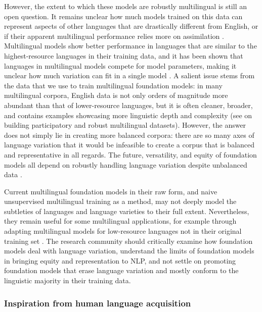 However, the extent to which these models are robustly multilingual is still an open question. 
It remains unclear how much models trained on this data can represent aspects of other languages that are drastically different from English, or if their apparent multilingual performance relies more on assimilation \citep{lauscher2020zero, virtanen2019multilingual, artetxe_cross-lingual_2020}. Multilingual models show better performance in languages that are similar to the highest-resource languages in their training data, and it has been shown that languages in multilingual models compete for model parameters, making it unclear how much variation can fit in a single model \citep{wang2020negative}. A salient issue stems from the data that we use to train multilingual foundation models: in many multilingual corpora, English data is not only orders of magnitude more abundant than that of lower-resource languages, but it is often cleaner, broader, and contains examples showcasing more linguistic depth and complexity \citep{caswell2021} (see \citet{nekoto2020participatory} on building participatory and robust multilingual datasets).
However, the answer does not simply lie in creating more balanced corpora: there are so many axes of language variation that it would be infeasible to create a corpus that is balanced and representative in all regards. The future, versatility, and equity of foundation models all depend on robustly handling language variation despite unbalanced data \cite[\eg][]{oren2019drolm}.

Current multilingual foundation models in their raw form, and naive unsupervised multilingual training as a method, may not deeply model the subtleties of languages and language varieties to their full extent. Nevertheless, they remain useful for some multilingual applications, for example through adapting multilingual models for low-resource languages not in their original training set \citep{wang2020extending}.
The research community should critically examine how foundation models deal with language variation, understand the limits of foundation models in bringing equity and representation to NLP, and not settle on promoting foundation models that erase language variation and mostly conform to the linguistic majority in their training data. 

\subsubsection{Inspiration from human language acquisition}

